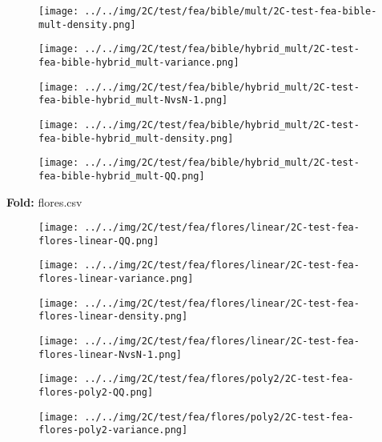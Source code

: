 \begin{figure}[H]
\centering	\texttt{[image: ../../img/2C/test/fea/bible/mult/2C-test-fea-bible-mult-density.png]}
\end{figure}
\begin{figure}[H]
\centering	\texttt{[image: ../../img/2C/test/fea/bible/hybrid\_mult/2C-test-fea-bible-hybrid\_mult-variance.png]}
\end{figure}
\begin{figure}[H]
\centering	\texttt{[image: ../../img/2C/test/fea/bible/hybrid\_mult/2C-test-fea-bible-hybrid\_mult-NvsN-1.png]}
\end{figure}
\begin{figure}[H]
\centering	\texttt{[image: ../../img/2C/test/fea/bible/hybrid\_mult/2C-test-fea-bible-hybrid\_mult-density.png]}
\end{figure}
\begin{figure}[H]
\centering	\texttt{[image: ../../img/2C/test/fea/bible/hybrid\_mult/2C-test-fea-bible-hybrid\_mult-QQ.png]}
\end{figure}
\textbf{Fold:} flores.csv
\begin{figure}[H]
\centering	\texttt{[image: ../../img/2C/test/fea/flores/linear/2C-test-fea-flores-linear-QQ.png]}
\end{figure}
\begin{figure}[H]
\centering	\texttt{[image: ../../img/2C/test/fea/flores/linear/2C-test-fea-flores-linear-variance.png]}
\end{figure}
\begin{figure}[H]
\centering	\texttt{[image: ../../img/2C/test/fea/flores/linear/2C-test-fea-flores-linear-density.png]}
\end{figure}
\begin{figure}[H]
\centering	\texttt{[image: ../../img/2C/test/fea/flores/linear/2C-test-fea-flores-linear-NvsN-1.png]}
\end{figure}
\begin{figure}[H]
\centering	\texttt{[image: ../../img/2C/test/fea/flores/poly2/2C-test-fea-flores-poly2-QQ.png]}
\end{figure}
\begin{figure}[H]
\centering	\texttt{[image: ../../img/2C/test/fea/flores/poly2/2C-test-fea-flores-poly2-variance.png]}
\end{figure}
